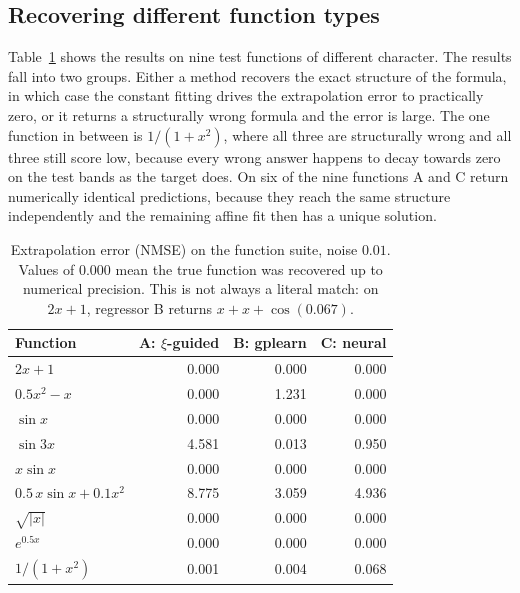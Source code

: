 \documentclass{article}
\begin{document}
\subsection{Recovering different function types}

Table~\ref{tab:suite} shows the results on nine test functions of
different character. The results fall into two groups. Either a method
recovers the exact structure of the formula, in which case the constant
fitting drives the extrapolation error to practically zero, or it
returns a structurally wrong formula and the error is large. The one
function in between is $1/(1+x^2)$, where all three are structurally
wrong and all three still score low, because every wrong answer happens
to decay towards zero on the test bands as the target does. On six of
the nine functions A and C return numerically identical predictions,
because they reach the same structure independently and the remaining
affine fit then has a unique solution.

\begin{table}[H]
\centering
\begin{tabular}{@{}lrrr@{}}
\toprule
Function & A: $\xi$-guided & B: gplearn & C: neural \\
\midrule
$2x + 1$                      & 0.000 & 0.000 & 0.000 \\
$0.5x^2 - x$                  & 0.000 & 1.231 & 0.000 \\
$\sin x$                      & 0.000 & 0.000 & 0.000 \\
$\sin 3x$                     & 4.581 & 0.013 & 0.950 \\
$x \sin x$                    & 0.000 & 0.000 & 0.000 \\
$0.5\,x\sin x + 0.1x^2$       & 8.775 & 3.059 & 4.936 \\
\addlinespace
$\sqrt{|x|}$                  & 0.000 & 0.000 & 0.000 \\
\addlinespace
$e^{0.5x}$                    & 0.000 & 0.000 & 0.000 \\
$1/(1+x^2)$                   & 0.001 & 0.004 & 0.068 \\
\bottomrule
\end{tabular}
\caption{Extrapolation error (NMSE) on the function suite, noise $0.01$.
Values of $0.000$ mean the true function was recovered up to numerical
precision. This is not always a literal match: on $2x+1$, regressor B
returns $x + x + \cos(0.067)$.}
\label{tab:suite}
\end{table}
\end{document}
